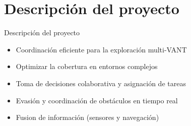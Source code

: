 \documentclass[
	12pt, %
	aspectratio=169, %
]{beamer}
\begin{document}
\section{Descripción del proyecto}
\begin{frame}{Descripción del proyecto}
  \begin{minipage}{0.47\textwidth}
    \begin{itemize}
    \item<1-> Coordinación eficiente para la exploración multi-VANT 
    \item<2-> Optimizar la cobertura en entornos complejos
    \item<3-> Toma de decisiones colaborativa y asignación de tareas
    \item<4-> Evasión y coordinación de obstáculos en tiempo real
    \item<5-> Fusion de información (sensores y navegación)
    \end{itemize}
  \end{minipage}
  \begin{minipage}{0.5\textwidth}
\end{minipage}
\end{frame}
\end{document}
